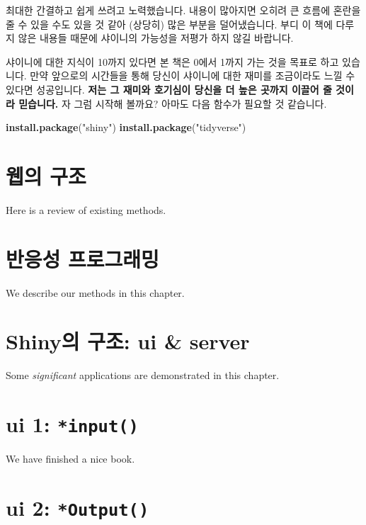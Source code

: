 \documentclass[]{book}
\newenvironment{Shaded}{\begin{snugshade}}{\end{snugshade}}
\newcommand{\KeywordTok}[1]{\textcolor[rgb]{0.13,0.29,0.53}{\textbf{#1}}}
\newcommand{\StringTok}[1]{\textcolor[rgb]{0.31,0.60,0.02}{#1}}
\newcommand{\NormalTok}[1]{#1}
\begin{document}
최대한 간결하고 쉽게 쓰려고 노력했습니다. 내용이 많아지면 오히려 큰
흐름에 혼란을 줄 수 있을 수도 있을 것 같아 (상당히) 많은 부분을
덜어냈습니다. 부디 이 책에 다루지 않은 내용들 때문에 샤이니의 가능성을
저평가 하지 않길 바랍니다.

샤이니에 대한 지식이 10까지 있다면 본 책은 0에서 1까지 가는 것을 목표로
하고 있습니다. 만약 앞으로의 시간들을 통해 당신이 샤이니에 대한 재미를
조금이라도 느낄 수 있다면 성공입니다. \textbf{저는 그 재미와 호기심이
당신을 더 높은 곳까지 이끌어 줄 것이라 믿습니다.} 자 그럼 시작해 볼까요?
아마도 다음 함수가 필요할 것 같습니다.

\begin{Shaded}
\begin{Highlighting}[]
\KeywordTok{install.package}\NormalTok{(}\StringTok{"shiny"}\NormalTok{)}
\KeywordTok{install.package}\NormalTok{(}\StringTok{"tidyverse"}\NormalTok{)}
\end{Highlighting}
\end{Shaded}

\chapter{웹의 구조}\label{web}

Here is a review of existing methods.

\chapter{반응성 프로그래밍}\label{reactive}

We describe our methods in this chapter.

\chapter{Shiny의 구조: ui \& server}\label{structure}

Some \emph{significant} applications are demonstrated in this chapter.

\chapter{\texorpdfstring{ui 1:
\texttt{*input()}}{ui 1: *input()}}\label{ui1}

We have finished a nice book.

\chapter{\texorpdfstring{ui 2:
\texttt{*Output()}}{ui 2: *Output()}}\label{ui2}
\end{document}
